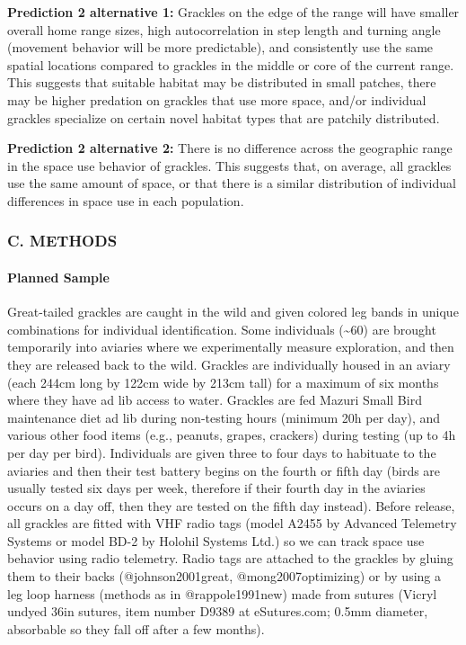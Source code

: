 \documentclass[]{article}
\let\oldparagraph\paragraph
\renewcommand{\paragraph}[1]{\oldparagraph{#1}\mbox{}}
\begin{document}
\textbf{Prediction 2 alternative 1:} Grackles on the edge of the range
will have smaller overall home range sizes, high autocorrelation in step
length and turning angle (movement behavior will be more predictable),
and consistently use the same spatial locations compared to grackles in
the middle or core of the current range. This suggests that suitable
habitat may be distributed in small patches, there may be higher
predation on grackles that use more space, and/or individual grackles
specialize on certain novel habitat types that are patchily distributed.

\textbf{Prediction 2 alternative 2:} There is no difference across the
geographic range in the space use behavior of grackles. This suggests
that, on average, all grackles use the same amount of space, or that
there is a similar distribution of individual differences in space use
in each population.

\subsubsection{C. METHODS}\label{c.-methods}

\paragraph{\texorpdfstring{\textbf{Planned
Sample}}{Planned Sample}}\label{planned-sample}

Great-tailed grackles are caught in the wild and given colored leg bands
in unique combinations for individual identification. Some individuals
(\textasciitilde{}60) are brought temporarily into aviaries where we
experimentally measure exploration, and then they are released back to
the wild. Grackles are individually housed in an aviary (each 244cm long
by 122cm wide by 213cm tall) for a maximum of six months where they have
ad lib access to water. Grackles are fed Mazuri Small Bird maintenance
diet ad lib during non-testing hours (minimum 20h per day), and various
other food items (e.g., peanuts, grapes, crackers) during testing (up to
4h per day per bird). Individuals are given three to four days to
habituate to the aviaries and then their test battery begins on the
fourth or fifth day (birds are usually tested six days per week,
therefore if their fourth day in the aviaries occurs on a day off, then
they are tested on the fifth day instead). Before release, all grackles
are fitted with VHF radio tags (model A2455 by Advanced Telemetry
Systems or model BD-2 by Holohil Systems Ltd.) so we can track space use
behavior using radio telemetry. Radio tags are attached to the grackles
by gluing them to their backs (@johnson2001great, @mong2007optimizing)
or by using a leg loop harness (methods as in @rappole1991new) made from
sutures (Vicryl undyed 36in sutures, item number D9389 at eSutures.com;
0.5mm diameter, absorbable so they fall off after a few months).
\end{document}

